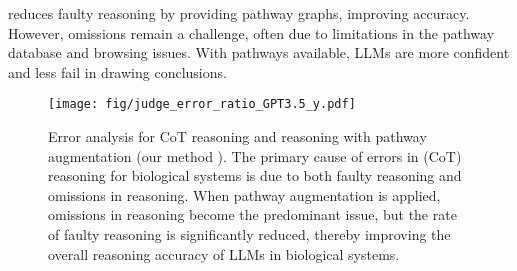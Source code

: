 \modelname reduces faulty reasoning by providing pathway graphs, improving accuracy. However, omissions remain a challenge, often due to limitations in the pathway database and browsing issues. With pathways available, LLMs are more confident and less fail in drawing conclusions.


\begin{figure}[!t]
    \centering    
    \renewcommand{\thesubfigure}{} %
    {\texttt{[image: fig/judge\_error\_ratio\_GPT3.5\_y.pdf]}}
    \vspace{-2mm}
    \caption{Error analysis for CoT reasoning and reasoning with pathway augmentation (our method \modelname). The primary cause of errors in (CoT) reasoning for biological systems is due to both faulty reasoning and omissions in reasoning. When pathway augmentation is applied, omissions in reasoning become the predominant issue, but the rate of faulty reasoning is significantly reduced, thereby improving the overall reasoning accuracy of LLMs in biological systems.}
    \label{fig error analysis}
    \vspace{-2mm} 
\end{figure}





